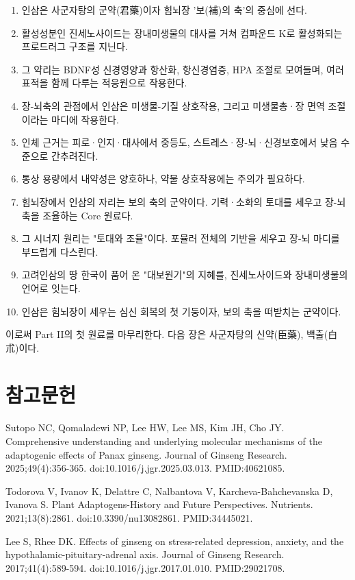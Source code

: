 \documentclass[12pt,oneside]{book}
\newcommand{\refstart}{\par\begingroup\fontsize{8.5pt}{10.2pt}\selectfont\setlength{\parskip}{1.4pt}\raggedright}
\newcommand{\reff}[2]{\par\hangindent=7mm\hangafter=1\noindent[#1]\hspace{2mm}#2\par}
\begin{document}
\begin{enumerate}[leftmargin=6mm,itemsep=1pt,topsep=2pt]
  \item 인삼은 사군자탕의 군약(君藥)이자 힘뇌장 '보(補)의 축'의 중심에 선다.
  \item 활성성분인 진세노사이드는 장내미생물의 대사를 거쳐 컴파운드 K로 활성화되는 프로드러그 구조를 지닌다.
  \item 그 약리는 BDNF성 신경영양과 항산화, 항신경염증, HPA 조절로 모여들며, 여러 표적을 함께 다루는 적응원으로 작용한다.
  \item 장-뇌축의 관점에서 인삼은 미생물-기질 상호작용, 그리고 미생물총·장 면역 조절이라는 마디에 작용한다.
  \item 인체 근거는 피로·인지·대사에서 중등도, 스트레스·장-뇌·신경보호에서 낮음 수준으로 간추려진다.
  \item 통상 용량에서 내약성은 양호하나, 약물 상호작용에는 주의가 필요하다.
  \item 힘뇌장에서 인삼의 자리는 보의 축의 군약이다. 기력·소화의 토대를 세우고 장-뇌축을 조율하는 Core 원료다.
  \item 그 시너지 원리는 "토대와 조율"이다. 포뮬러 전체의 기반을 세우고 장-뇌 마디를 부드럽게 다스린다.
  \item 고려인삼의 땅 한국이 품어 온 "대보원기"의 지혜를, 진세노사이드와 장내미생물의 언어로 잇는다.
  \item 인삼은 힘뇌장이 세우는 심신 회복의 첫 기둥이자, 보의 축을 떠받치는 군약이다.
\end{enumerate}

이로써 Part II의 첫 원료를 마무리한다. 다음 장은 사군자탕의 신약(臣藥), 백출(白朮)이다.

\section*{참고문헌}

\refstart

\reff{1}{Sutopo NC, Qomaladewi NP, Lee HW, Lee MS, Kim JH, Cho JY. Comprehensive understanding and underlying molecular mechanisms of the adaptogenic effects of Panax ginseng. Journal of Ginseng Research. 2025;49(4):356-365. doi:10.1016/j.jgr.2025.03.013. PMID:40621085.}

\reff{2}{Todorova V, Ivanov K, Delattre C, Nalbantova V, Karcheva-Bahchevanska D, Ivanova S. Plant Adaptogens-History and Future Perspectives. Nutrients. 2021;13(8):2861. doi:10.3390/nu13082861. PMID:34445021.}

\reff{3}{Lee S, Rhee DK. Effects of ginseng on stress-related depression, anxiety, and the hypothalamic-pituitary-adrenal axis. Journal of Ginseng Research. 2017;41(4):589-594. doi:10.1016/j.jgr.2017.01.010. PMID:29021708.}
\end{document}
